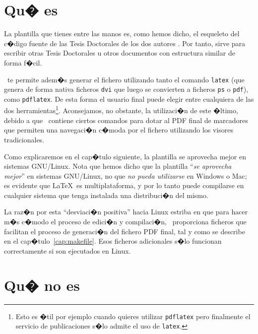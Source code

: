 \section{Qu� es \texis}
\label{cap1:sec:que-es}

La plantilla que tienes entre las manos es, como hemos dicho, el
esqueleto del c�digo fuente de las Tesis Doctorales de los dos autores
\citep{GomezMartinMA2008PhD, GomezMartinPP2008PhD}. Por tanto, sirve
para escribir otras Tesis Doctorales u otros documentos con estructura
similar de forma f�cil.

\texis\ te permite adem�s generar el fichero utilizando tanto el
comando \texttt{latex} (que genera de forma nativa ficheros
\texttt{dvi} que luego se convierten a ficheros \texttt{ps} o
\texttt{pdf}), como \texttt{pdflatex}. De esta forma el usuario final
puede elegir entre cualquiera de las dos herramientas\footnote{Esto es
  �til por ejemplo cuando quieres utilizar \texttt{pdflatex} pero
  finalmente el servicio de publicaciones s�lo admite el uso de
  \texttt{latex}.}.  Aconsejamos, no obstante, la utilizaci�n de este
�ltimo, debido a que \texis\ contiene ciertos comandos para dotar al
PDF final de marcadores que permiten una navegaci�n c�moda por el
fichero utilizando los visores tradicionales.

\medskip

Como explicaremos en el cap�tulo siguiente, la plantilla se aprovecha
mejor en sistemas GNU/Linux. Nota que hemos dicho que la plantilla
``\emph{se aprovecha mejor}'' en sistemas GNU/Linux, no que \emph{no
pueda utilizarse} en Windows o Mac; es evidente que \LaTeX\ es
multiplataforma, y por lo tanto puede compilarse en cualquier sistema
que tenga instalada una distribuci�n del mismo.

La raz�n por esta ``desviaci�n positiva'' hacia Linux estriba en que
para hacer m�s c�modo el proceso de edici�n y compilaci�n, \texis\
proporciona ficheros que facilitan el proceso de generaci�n del
fichero PDF final, tal y como se describe en el
cap�tulo~\ref{cap:makefile}.  Esos ficheros adicionales s�lo funcionan
correctamente si son ejecutados en Linux.

\section{Qu� no es}
\label{cap1:sec:que-no-es}

